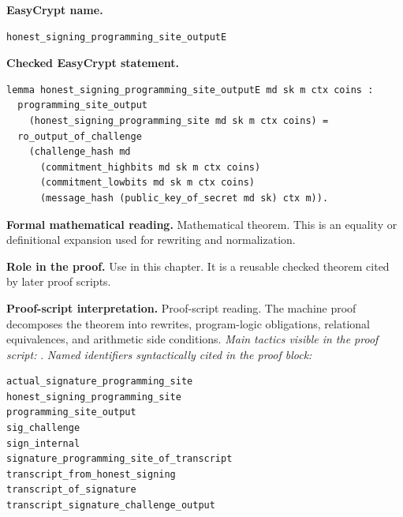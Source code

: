 \begin{formaltheorem}
\noindent\textbf{EasyCrypt name.}
\begin{lstlisting}[language=EasyCrypt,basicstyle=\ttfamily\scriptsize]
honest_signing_programming_site_outputE
\end{lstlisting}
\noindent\textbf{Checked EasyCrypt statement.}
\begin{lstlisting}[language=EasyCrypt,basicstyle=\ttfamily\scriptsize]
lemma honest_signing_programming_site_outputE md sk m ctx coins :
  programming_site_output
    (honest_signing_programming_site md sk m ctx coins) =
  ro_output_of_challenge
    (challenge_hash md
      (commitment_highbits md sk m ctx coins)
      (commitment_lowbits md sk m ctx coins)
      (message_hash (public_key_of_secret md sk) ctx m)).
\end{lstlisting}
\noindent\textbf{Formal mathematical reading.}
Mathematical theorem. This is an equality or definitional expansion used for rewriting and normalization.

\noindent\textbf{Role in the proof.}
Use in this chapter. It is a reusable checked theorem cited by later proof scripts.

\noindent\textbf{Proof-script interpretation.}
Proof-script reading. The machine proof decomposes the theorem into rewrites, program-logic obligations, relational equivalences, and arithmetic side conditions.
\emph{Main tactics visible in the proof script:} .
\emph{Named identifiers syntactically cited in the proof block:}
\begin{lstlisting}[language=EasyCrypt,basicstyle=\ttfamily\scriptsize]
actual_signature_programming_site
honest_signing_programming_site
programming_site_output
sig_challenge
sign_internal
signature_programming_site_of_transcript
transcript_from_honest_signing
transcript_of_signature
transcript_signature_challenge_output
\end{lstlisting}

\end{formaltheorem}

